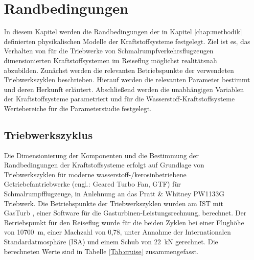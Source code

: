 \chapter{Randbedingungen}
\label{chap:param}

In diesem Kapitel werden die Randbedingungen der in Kapitel \ref{chap:methodik} definierten physikalischen Modelle der Kraftstoffsysteme festgelegt. Ziel ist es, das Verhalten von für die Triebwerke von Schmalrumpfverkehrsflugzeugen dimensionierten Kraftstoffsystemen im Reiseflug möglichst realitätsnah abzubilden. Zunächst werden die relevanten Betriebspunkte der verwendeten Triebwerkszyklen beschrieben. Hierauf werden die relevanten Parameter bestimmt und deren Herkunft erläutert. Abschließend werden die unabhängigen Variablen der Kraftstoffsysteme parametriert und für die Wasserstoff-Kraftstoffsysteme Wertebereiche für die Parameterstudie festgelegt.

\section{Triebwerkszyklus}

Die Dimensionierung der Komponenten und die Bestimmung der Randbedingungen der Kraftstoffsysteme erfolgt auf Grundlage von Triebwerkszyklen für moderne wasserstoff-/kerosinbetriebene Getriebefantriebwerke (engl.: Geared Turbo Fan, GTF) für Schmalrumpfflugzeuge, in Anlehnung an das Pratt \& Whitney PW1133G Triebwerk. Die Betriebspunkte der Triebwerkszyklen wurden am IST mit GasTurb \cite{GasTurbGmbH.2021}, einer Software für die Gasturbinen-Leistungsrechnung, berechnet. Der Betriebspunkt für den Reiseflug wurde für die beiden Zyklen bei einer Flughöhe von \SI{10700}{\m}, einer Machzahl von 0,78, unter Annahme der Internationalen Standardatmosphäre (ISA) und einem Schub von \SI{22}{\kilo\N} gerechnet. Die berechneten Werte sind in Tabelle \ref{Tab:cruise} zusammengefasst.

